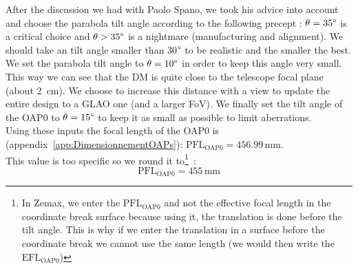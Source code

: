 \documentclass[12pt,a4paper]{article}
\begin{document}
After the discussion we had with Paolo Spano, we took his advice into account and choose the parabola tilt angle according to the following precept : $\theta= 35\degree$ is a critical choice and $\theta > 35\degree$ is a nightmare (manufacturing and alignment). We should take an tilt angle smaller than 30$\degree$ to be realistic and the smaller the best.\\

We set the parabola tilt angle to $\theta = 10\degree$ in order to keep this angle very small. This way we can see that the DM is quite close to the telescope focal plane (about 2~cm). We choose to increase this distance with a view to update the entire design to a GLAO one (and a larger FoV). We finally set the tilt angle of the OAP0 to $\theta = 15\degree$ to keep it as small as possible to limit aberrations.\\

Using these inputs the focal length of the OAP0 is (appendix~\ref{app:DimensionnementOAPs}): $\text{PFL}_{\text{OAP0}} = 456.99\,\text{mm}	\nonumber$.\\
This value is too specific so we round it to\footnote{In Zemax, we enter the $\text{PFL}_{\text{OAP0}}$ and not the effective focal length in the coordinate break surface because using it, the translation is done before the tilt angle. This is why if we enter the translation in a surface before the coordinate break we cannot use the same length (we would then write the $\text{EFL}_{\text{OAP0}}$)}~:
\begin{equation}
	\text{PFL}_{\text{OAP0}} = 455\,\text{mm}	\nonumber
\end{equation}
\end{document}

